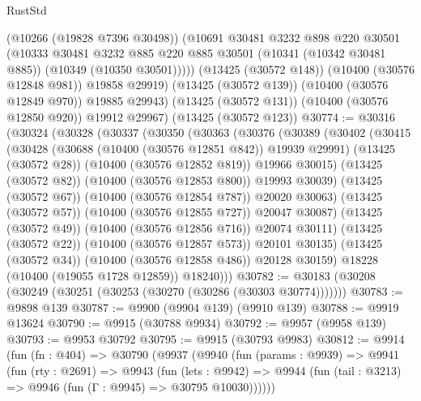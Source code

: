 \begin{lexlean}{RustStd}
\begin{coremodule}
            (@10266 (@19828 @7396 @30498))
            (@10691
              @30481
              @3232
              @898
              @220
              @30501
              (@10333
                @30481
                @3232
                @885
                @220
                @885
                @30501
                (@10341 (@10342 @30481 @885))
                (@10349 (@10350 @30501)))))
          (@13425 (@30572 @148))
          (@10400 (@30576 @12848 @981))
          @19858
          @29919)
        (@13425 (@30572 @139))
        (@10400 (@30576 @12849 @970))
        @19885
        @29943)
      (@13425 (@30572 @131))
      (@10400 (@30576 @12850 @920))
      @19912
      @29967)
    (@13425 (@30572 @123))
@30774 := @30316
    (@30324
      (@30328
        (@30337
          (@30350
            (@30363
              (@30376
                (@30389
                  (@30402
                    (@30415
                      (@30428
                        (@30688 (@10400 (@30576 @12851 @842)) @19939 @29991)
                        (@13425 (@30572 @28))
                        (@10400 (@30576 @12852 @819))
                        @19966
                        @30015)
                      (@13425 (@30572 @82))
                      (@10400 (@30576 @12853 @800))
                      @19993
                      @30039)
                    (@13425 (@30572 @67))
                    (@10400 (@30576 @12854 @787))
                    @20020
                    @30063)
                  (@13425 (@30572 @57))
                  (@10400 (@30576 @12855 @727))
                  @20047
                  @30087)
                (@13425 (@30572 @49))
                (@10400 (@30576 @12856 @716))
                @20074
                @30111)
              (@13425 (@30572 @22))
              (@10400 (@30576 @12857 @573))
              @20101
              @30135)
            (@13425 (@30572 @34))
            (@10400 (@30576 @12858 @486))
            @20128
            @30159)
          @18228
          (@10400 (@19055 @1728 @12859))
          @18240)))
@30782 := @30183 (@30208 (@30249 (@30251 (@30253 (@30270 (@30286 (@30303 @30774)))))))
@30783 := @9898 @139
@30787 := @9900 (@9904 @139) (@9910 @139)
@30788 := @9919 @13624
@30790 := @9915 (@30788 @9934)
@30792 := @9957 (@9958 @139)
@30793 := @9953 @30792
@30795 := @9915 (@30793 @9983)
@30812 := @9914
    (fun (fn : @404) =>
    @30790
      (@9937
        (@9940
          (fun (params : @9939) =>
          @9941
            (fun (rty : @2691) =>
            @9943
              (fun (lets : @9942) =>
              @9944 (fun (tail : @3213) => @9946 (fun (Γ : @9945) => @30795 @10030))))))

\end{coremodule}
\end{lexlean}
